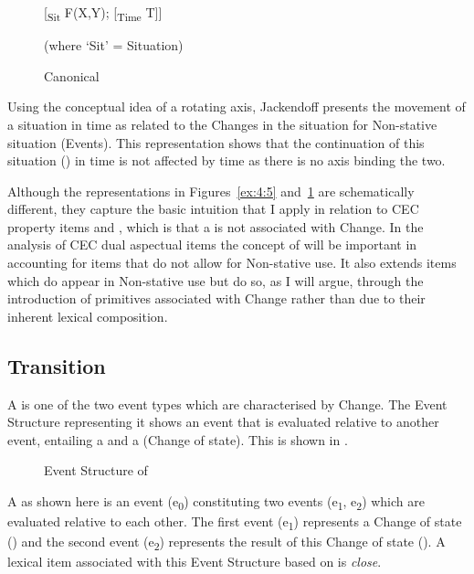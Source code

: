 \begin{figure}\caption{\label{ex:4:6}Canonical  \citep[327]{Jackendoff1996}}
[\textsubscript{Sit} F(X,Y); [\textsubscript{Time} T]]

(where ‘Sit’ = Situation) 
\end{figure}

Using the conceptual idea of a rotating axis, Jackendoff presents the movement of a situation
in time as related to the Changes in the situation for Non-stative situation (Events).  This
representation shows that the continuation of this situation ()
in time is not affected by time as there is no axis binding the two.

Although the representations in Figures~\ref{ex:4:5} and~\ref{ex:4:6} are
schematically different, they capture the basic intuition that I apply
in relation to CEC property items and , which is
that a  is not associated with Change.  In the analysis of CEC
dual aspectual items the concept of  will be important in
accounting for items that do not allow for Non-stative use.  It also
extends items which do appear in Non-stative use but do so, as I will
argue, through the introduction of primitives associated with Change
rather than due to their inherent lexical composition.

 
\subsection{Transition}\label{sec:4.2.3}

A  is one of the two event types which are characterised by
Change.  The Event Structure representing it shows an event that is
evaluated relative to another event, entailing a  and a 
(Change of state).  This is shown in .

\begin{figure}
\caption{Event Structure of \label{ex:4:7}}
\end{figure}

A  as shown here is an event (e\textsubscript{0})
constituting two events (e\textsubscript{1}, e\textsubscript{2}) which
are evaluated relative to each other.  The first event
(e\textsubscript{1}) represents a Change of state () and the
second event (e\textsubscript{2}) represents the result of this Change
of state ().  A lexical item associated with this Event Structure
based on \citet{Pustejovsky1991} is \textit{close}.

